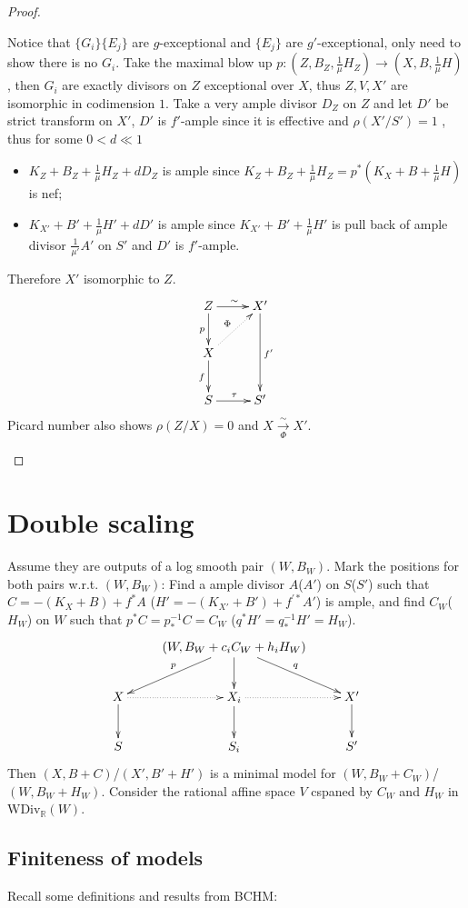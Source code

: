 \documentclass{article}
\begin{document}
\begin{proof}
\begin{enumerate}
		Notice that $ \{G_i\} \{E_j\} $ are $ g $-exceptional and $ \{E_j\} $ are $ g' $-exceptional, only need to show there is no $ G_i $. Take the maximal blow up $ p:(Z,B_Z,\frac{1}{\mu} H_Z)\to (X,B,\frac{1}{\mu} H) $, then $ G_i $ are exactly divisors on $ Z $ exceptional over $ X $, thus $ Z,V,X' $ are isomorphic in codimension $ 1 $. Take a very ample divisor $ D_Z $ on $ Z $ and let $ D'  $ be strict transform on $ X' $, $ D' $ is $ f' $-ample since it is effective and $ \rho(X'/S')=1 $ , thus for some $ 0<d\ll1 $ 
		\begin{itemize}
			\item $ K_Z+B_Z+\frac{1}{\mu }H_Z+dD_Z $ is ample since $ K_Z+B_Z+\frac{1}{\mu }H_Z=p^*(K_X+B+\frac{1}{\mu }H) $ is nef;
			\item $ K_{X'}+B'+\frac{1}{\mu }H'+dD' $ is ample since $ K_{X'}+B'+\frac{1}{\mu }H' $ is pull back of ample divisor $ \frac{1}{\mu'}A' $ on $ S' $ and $ D' $ is $ f' $-ample.
		\end{itemize}
		Therefore $ X' $ isomorphic to $ Z $.
		$$ \xymatrix{
			Z\ar[r]^\sim\ar[d]_p&X'\ar[dd]^{f'}\\
			X\ar[d]_f\ar@{.>}[ur]^\Phi&\\
			S\ar[r]^\tau&S' } $$
		Picard number also shows $ \rho(Z/X)=0 $ and $ X\xrightarrow[\Phi]{\sim}X' $.
	\end{enumerate}
\end{proof}

\section{Double scaling}
Assume they are outputs of a log smooth pair $ (W,B_W) $. Mark the positions for both pairs w.r.t. $ (W,B_W) $: Find a ample divisor $ A $($ A' $) on $ S $($ S' $) such that $ C=-(K_X+B)+f^*A $ ($ H'=-(K_{X'}+B')+f^{'*}A' $) is ample, and find $ C_W $($ H_W $) on $ W $ such that $ p^*C=p^{-1}_*C=C_W $ ($ q^*H'=q^{-1}_*H'=H_W $). 
$$ \xymatrix{
	&(W,B_W+c_iC_W+h_iH_W)\ar[d]\ar[ld]_p\ar[rd]^{q}&\\
	X\ar[d]\ar@{.>}[r]&X_i\ar@{.>}[r]\ar[d]&X'\ar[d]\\
	S&S_i&S'} $$ 
Then $ (X,B+C) $/$ (X',B'+H') $ is a minimal model for $ (W,B_W+C_W) $/$ (W,B_W+H_W) $.  Consider the rational affine space $ V $ cspaned by $ C_W $ and $ H_W $ in $ \mathrm{WDiv}_\mathbb{R}(W) $.
\subsection{Finiteness of models}
Recall some definitions and results from BCHM:
\end{document}
